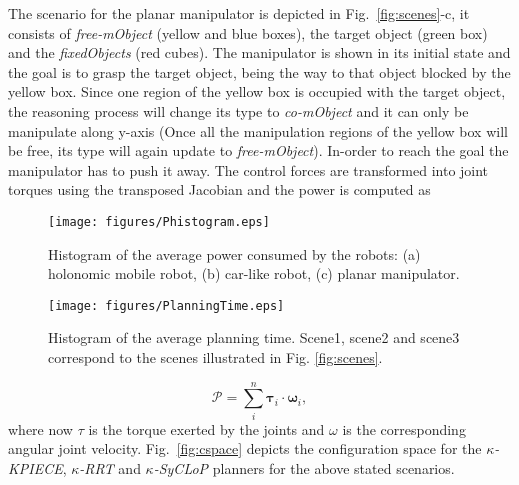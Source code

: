 \documentclass[twocolumn]{svjour3}          %
\begin{document}
The scenario for the planar manipulator is depicted in Fig.~\ref{fig:scenes}-c, it consists of \textit{free-mObject} 
(yellow and blue boxes), the target object (green box) and the \textit{fixedObjects} (red cubes). The manipulator is shown in its initial state and the goal is to grasp the target object, being the way to that object  blocked by the yellow box. Since one region of the yellow box is occupied with the target object, the reasoning process will change its type to \textit{co-mObject} and it can only be manipulate along y-axis (Once all the manipulation regions of the yellow box will be free, its type will again update to \textit{free-mObject}). In-order to reach the goal the manipulator has to push it away.  The control forces are transformed into joint torques using the 
transposed Jacobian and the power is computed as
\begin{figure}[h]
\begin{center}
   \texttt{[image: figures/Phistogram.eps]}
   \caption{Histogram of the average power consumed by the robots: (a) holonomic mobile robot, (b) car-like robot, (c) planar manipulator.}\label{fig:phistogram}
\end{center}
\end{figure}
\begin{figure}[h]
\begin{center}
   \texttt{[image: figures/PlanningTime.eps]}
   \caption{Histogram of the average planning time. Scene1, scene2 and scene3 correspond to the scenes illustrated in Fig. \ref{fig:scenes}.}\label{fig:planningtime}
   \end{center}
\end{figure}
\begin{equation}
\label{eq:mpower}
  \mathcal{P}  =\sum\limits_{i}^n \mathbf{\tau}_i\cdot\mathbf{\omega}_i,
\end{equation}
where now $\tau$ is the torque exerted by the joints and $\omega$ is the corresponding angular joint velocity. Fig.~\ref{fig:cspace} depicts the configuration space for the \textit{$\kappa$-KPIECE}, 
\textit{$\kappa$-RRT} and \textit{$\kappa$-SyCLoP} planners for the above stated scenarios.
\end{document}

